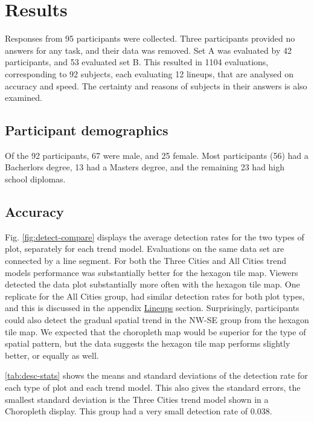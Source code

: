 \documentclass[conference,final,]{IEEEtran}
\begin{document}
\hypertarget{results}{%
\section{Results}\label{results}}

Responses from 95 participants were collected. Three participants provided no answers for any task, and their data was removed. Set A was evaluated by 42 participants, and 53 evaluated set B. This resulted in 1104 evaluations, corresponding to 92 subjects, each evaluating 12 lineups, that are analysed on accuracy and speed. The certainty and reasons of subjects in their answers is also examined.

\hypertarget{participant-demographics}{%
\subsection{Participant demographics}\label{participant-demographics}}

Of the 92 participants, 67 were male, and 25 female. Most participants (56) had a Bacherlors degree, 13 had a Masters degree, and the remaining 23 had high school diplomas.

\hypertarget{accuracy}{%
\subsection{Accuracy}\label{accuracy}}

Fig. \ref{fig:detect-compare} displays the average detection rates for the two types of plot, separately for each trend model. Evaluations on the same data set are connected by a line segment. For both the Three Cities and All Cities trend models performance was substantially better for the hexagon tile map. Viewers detected the data plot substantially more often with the hexagon tile map. One replicate for the All Cities group, had similar detection rates for both plot types, and this is discussed in the appendix \protect\hyperlink{lineups}{Lineups} section. Surprisingly, participants could also detect the gradual spatial trend in the NW-SE group from the hexagon tile map. We expected that the choropleth map would be superior for the type of spatial pattern, but the data suggests the hexagon tile map performs slightly better, or equally as well.

\ref{tab:desc-stats} shows the means and standard deviations of the detection rate for each type of plot and each trend model. This also gives the standard errors, the smallest standard deviation is the Three Cities trend model shown in a Choropleth display. This group had a very small detection rate of 0.038.
\end{document}
